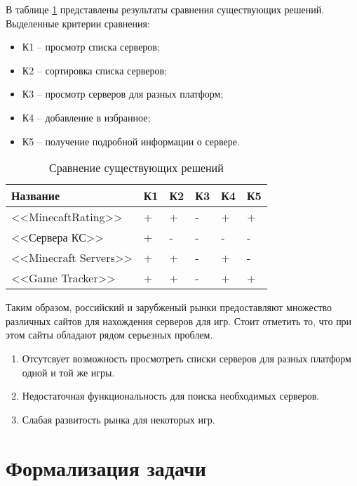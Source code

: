 В таблице \ref{tbl:compare_realizations} представлены результаты сравнения существующих решений. Выделенные критерии сравнения:

\begin{itemize}
    \item К1 -- просмотр списка серверов;
    \item К2 -- сортировка списка серверов;
    \item К3 -- просмотр серверов для разных платформ;
    \item К4 -- добавление в избранное;
    \item К5 -- получение подробной информации о сервере.
\end{itemize}

\captionsetup{justification=raggedleft,singlelinecheck=off}
\begin{table}[H]
    \centering
	\caption{Сравнение существующих решений}
    \label{tbl:compare_realizations}
	\begin{tabular}{|l|l|l|l|l|l|}
        \hline
        \textbf{Название} & \textbf{К1} & \textbf{К2} & \textbf{К3} & \textbf{К4} & \textbf{К5} \\ \hline

        <<MinecaftRating>>      & + & + & - & + & + \\ \hline
        <<Сервера КС>>          & + & - & - & - & - \\ \hline
        <<Minecraft Servers>>   & + & + & - & + & - \\ \hline
        <<Game Tracker>>        & + & + & - & + & + \\ \hline

    \end{tabular}
\end{table}

Таким образом, российский и зарубженый рынки предоставляют множество различных сайтов для нахождения серверов для игр. Стоит отметить то, что при этом сайты обладают рядом серьезных проблем.

\begin{enumerate}
    \item Отсутсвует возможность просмотреть списки серверов для разных платформ одной и той же игры.
    \item Недостаточная функциональность для поиска необходимых серверов.
    \item Слабая развитость рынка для некоторых игр.
\end{enumerate}


\section{Формализация задачи}

